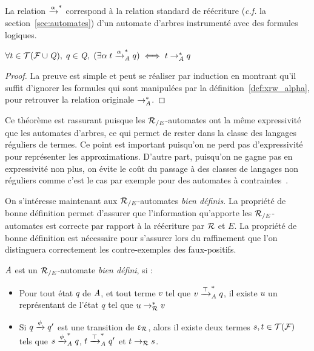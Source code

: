 La relation $\xrightarrow{\alpha}^*$ correspond à la relation standard de réécriture 
(\textit{c.f.} la section~\ref{sec:automates}) d'un automate d'arbres instrumenté avec
des formules logiques.

\begin{theorem}\label{th:equiv}{\quad\quad
  $\forall t\in\mathcal{ T(F \cup \mathit Q)},\; q \in \mathit Q,\; (\exists \alpha\; t \xrightarrow{\alpha}^*_\mathit A q) \; \Longleftrightarrow \; t \rightarrow_\mathit A^* q$}
\end{theorem}

\begin{proof}
  La preuve est simple et peut se réaliser par induction en montrant qu'il suffit
  d'ignorer les formules qui sont manipulées par la définition~\ref{def:xrw_alpha},
  pour retrouver la relation originale $\rightarrow_\mathit A^*$. 
\end{proof}

Ce théorème est rassurant puisque les ${\mathcal R_{/E}}$-automates ont la même expressivité
que les automates d'arbres, ce qui permet de rester dans la classe des langages réguliers
de termes. Ce point est important puisqu'on ne perd pas d'expressivité pour représenter les
approximations. D'autre part, puisqu'on ne gagne pas en expressivité
non plus, on évite le coût du passage à des classes de langages non réguliers
comme c'est le cas par exemple pour des automates à contraintes~\cite{TATA}.


On s'intéresse maintenant aux ${\mathcal R_{/E}}$-automates {\em bien définis}. 
La propriété de bonne définition permet d'assurer que l'information
qu'apporte les ${\mathcal R_{/E}}$-automates est correcte par rapport à la réécriture
par $\mathcal R$ et $E$. La propriété de bonne définition est nécessaire pour s'assurer 
lors du raffinement que l'on distinguera correctement les contre-exemples des faux-positifs.


\begin{definition}
  \label{def:well-defined}
  $\mathit A$ est un ${\mathcal R_{/E}}$-automate \emph{bien défini}, si :
  \begin{itemize}
  \item Pour tout état $q$ de $\mathit A$, et tout terme $v$ tel que
    $v \xrightarrow{\top}^*_\mathit A q$, il existe $u$ un représentant de l'état $q$ tel que $u \rightarrow^*_\mathcal R v$
  \item Si $q \xrightarrow{\phi} q'$ est une transition de $\upvarepsilon_{\mathcal R}$, alors il existe deux termes
    $s,t\in \mathcal{T(F)}$ tels que $s\xrightarrow{\phi}^*_\mathit A q$, $t\xrightarrow{\top}^*_\mathit A q'$
    et $t \rightarrow_\mathcal R s$.
  \end{itemize}
\end{definition}

